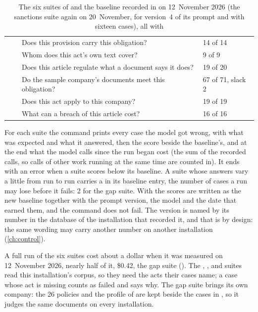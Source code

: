 \begin{table}[H]
\caption{The six suites of  and the baseline recorded in
 on 12~November 2026 (the sanctions suite again on
20~November, for version~4 of its prompt and with sixteen cases), all with
}\label{tab:ops:suites}
\begin{tabularx}{\textwidth}{@{}L{22mm}L{47mm}YL{22mm}@{}}
\toprule
{} &  &  &  \\
\midrule
{} &  & Does this provision carry this obligation? & 14 of 14 \\
 &  & Whom does this act's own text cover? & 9 of 9 \\
 &  & Does this article regulate what a document says it does? & 19 of 20 \\
 &  & Do the sample company's documents meet this obligation? & 67 of 71, slack 2 \\
 &  & Does this act apply to this company? & 19 of 19 \\
 &  & What can a breach of this article cost? & 16 of 16 \\
\bottomrule
\end{tabularx}
\end{table}

For each suite the command prints every case the model got wrong, with what was expected and
what it answered, then the score beside the baseline's, and at the end what the model calls
since the run began cost (the sum of the recorded calls, so calls of other work running at
the same time are counted in). It ends with an error when a suite scores below its baseline.
A suite whose answers vary a little from run to run carries a  in its baseline
entry, the number of cases a run may lose before it fails: 2 for the gap suite. With
 the scores are written as the new baseline together with the prompt version,
the model and the date that earned them, and the command does not fail. The version is named
by its number in the database of the installation that recorded it, and that is by design: the
same wording may carry another number on another installation (\cref{ch:control}).

A full run of the six suites cost about a dollar when it was measured on 12~November 2026,
nearly half of it, \$0.42, the gap suite ().
The , ,  and  suites read
this installation's corpus, so they need the acts their cases name; a case whose act is
missing counts as failed and says why. The gap suite brings its own company: the 26 policies
and the profile of \demo{} are kept beside the cases in ,
so it judges the same documents on every installation.

